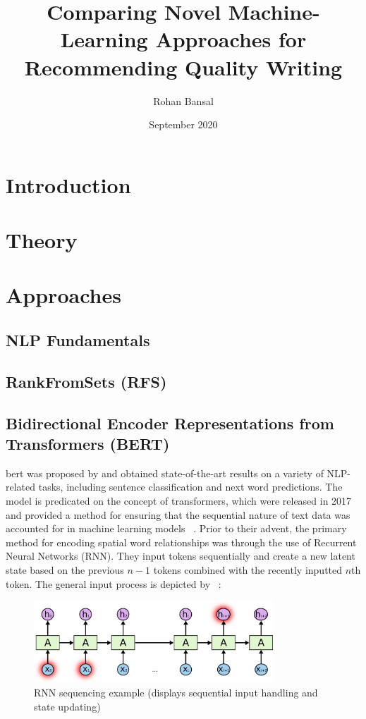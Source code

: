 \documentclass[12pt]{article}
\title{Comparing Novel Machine-Learning Approaches for Recommending Quality Writing}
\author{Rohan Bansal}
\date{September 2020}
\begin{document}


\tableofcontents
\newpage

\section{Introduction}


\section{Theory}


\section{Approaches}

\subsection{NLP Fundamentals}


\subsection{RankFromSets (RFS)}


\subsection{Bidirectional Encoder Representations from Transformers (BERT)}
\acrshort{bert} was proposed by \textcite{devlin2019bert:} and obtained state-of-the-art results on a variety of NLP-related tasks, including sentence classification and next word predictions. The model is predicated on the concept of transformers, which were released in 2017 and provided a method for ensuring that the sequential nature of text data was accounted for in machine learning models ~\parencite{transformers:}. Prior to their advent, the primary method for encoding spatial word relationships was through the use of Recurrent Neural Networks (RNN). They input tokens sequentially and create a new latent state based on the previous $n-1$ tokens combined with the recently inputted $n$th token. The general input process is depicted by ~\textcite{olah_2015}:

\begin{figure}[h]
\centering
\includegraphics[width=0.8\textwidth]{fig/rnn.png}
\caption{RNN sequencing example (displays sequential input handling and state updating)
}
\label{fig:rnn}
\end{figure}
\end{document}
